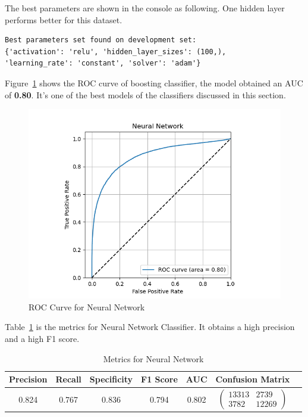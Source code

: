The best parameters are shown in the console as following. One hidden layer performs better for this dataset.

\begin{verbatim}
Best parameters set found on development set:
{'activation': 'relu', 'hidden_layer_sizes': (100,), 
'learning_rate': 'constant', 'solver': 'adam'}
\end{verbatim}

Figure~\ref{fig:roc-nn} shows the ROC curve of boosting classifier, the model obtained an AUC of \textbf{0.80}. It's one of the best models of the classifiers discussed in this section.

\begin{figure}
    \centering
    \includegraphics[width=1\linewidth]{docs//assets/individual_roc_curve_Neural Network.png}
    \caption{ROC Curve for Neural Network}
    \label{fig:roc-nn}
\end{figure}

Table~\ref{tab:nn} is the metrics for Neural Network Classifier. It obtains a high precision and a high F1 score.

\begin{table}
\centering
\begin{tabular}{|c|c|c|c|c|c|c}
\hline
\textbf{Precision} & \textbf{Recall} & \textbf{Specificity} & \textbf{F1 Score} & \textbf{AUC} & \textbf{Confusion Matrix} \\
\hline
0.824 & 0.767 & 0.836 & 0.794 & 0.802 & $\left(\begin{array}{cc} 13313 & 2739 \\ 3782 & 12269 \end{array}\right)$ \\ 
\hline
\end{tabular}
\caption{Metrics for Neural Network}
\label{tab:nn}
\end{table}

